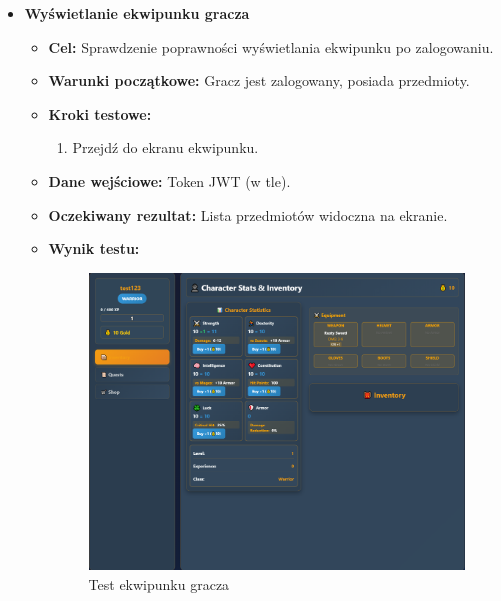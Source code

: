 \begin{itemize}
    \item \textbf{Wyświetlanie ekwipunku gracza}
    \begin{itemize}
        \item \textbf{Cel:} Sprawdzenie poprawności wyświetlania ekwipunku po zalogowaniu.
        \item \textbf{Warunki początkowe:} Gracz jest zalogowany, posiada przedmioty.
        \item \textbf{Kroki testowe:}
        \begin{enumerate}
            \item Przejdź do ekranu ekwipunku.
        \end{enumerate}
        \item \textbf{Dane wejściowe:} Token JWT (w tle).
        \item \textbf{Oczekiwany rezultat:} Lista przedmiotów widoczna na ekranie.
        \item \textbf{Wynik testu:}
        \begin{figure}[H]
            \includegraphics[width=480px]{figures/testy/test-inventory-front.png}
            \caption{Test ekwipunku gracza}
        \end{figure}
    \end{itemize}


\end{itemize}
